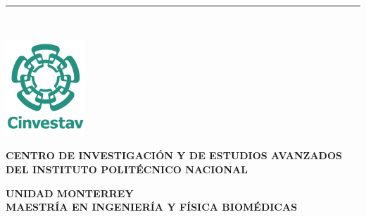 %
\begin{titlepage}
	\flushright
	\hfill
	\vfill
	{\LARGE\thesisTitle \par}
	\rule[5pt]{\textwidth}{.4pt} \par
	{\Large\thesisName}
	\vfill
	\textit{\large\thesisDate} \\
\end{titlepage}


\begin{titlepage}
	\tgherosfont
	\centering
	
	\noindent
	\hspace{-3cm}
	\begin{minipage}[h]{0.2\textwidth}
		\hspace{-10mm} %
		\includegraphics[width=3cm]{gfx/logospng1.png}
	\end{minipage}%
	\begin{minipage}[h]{0.8\textwidth}
		\centering
		\Large 
		\textbf{CENTRO DE INVESTIGACIÓN Y DE ESTUDIOS AVANZADOS DEL INSTITUTO POLITÉCNICO NACIONAL}
	\end{minipage}


	{\Large \textbf{UNIDAD MONTERREY}} \\[4mm]
	{\Large \textbf{MAESTRÍA EN INGENIERÍA Y FÍSICA BIOMÉDICAS}} \\[10mm]
	



\end{titlepage}
